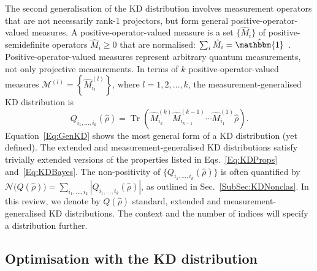\documentclass[%
 reprint,
superscriptaddress,
nofootinbib,
bibnotes,
 amsmath,amssymb,
 aps,
]{revtex4-1}
\theoremstyle{plain}
\DeclareMathOperator{\Tr}{Tr}
\newcommand{\LParen}{ \bm{(} }
\newcommand{\RParen}{ \bm{)} }
\begin{document}
The second generalisation of the KD distribution involves 
measurement operators that are not necessarily rank-1 projectors, but form general positive-operator-valued measures.  A positive-operator-valued measure is a set $\{ \hat{M}_i \}$ of 
positive-semidefinite operators $\hat{M}_i \geq 0$ that are normalised: $\sum_i \hat{M}_i = \hat{\mathbbm{1}}$~\cite{Nielsen11}.
Positive-operator-valued measures represent arbitrary quantum measurements, not only projective measurements.
In terms of $k$ positive-operator-valued measures $\mathcal{M}^{(l)} = \left\{  \hat{M}^{(l)}_{i_l} \right\}$, where $l = 1, 2, \ldots, k$, the measurement-generalised KD distribution is
\begin{equation}
\label{Eq:GenKD}
Q_{i_1,\ldots,i_k} (\hat{\rho}) = \Tr \left( \hat{M}^{(k)}_{i_k} \hat{M}^{(k-1)}_{i_{k-1}} \cdots \hat{M}^{(1)}_{i_1} \hat{\rho}    \right) .
\end{equation}
Equation~\eqref{Eq:GenKD} shows the 
most general form of a KD distribution (yet defined). 
The extended and measurement-generalised KD distributions satisfy trivially extended versions of the properties listed in Eqs.~\eqref{Eq:KDProps} and~\eqref{Eq:KDBayes}. The non-positivity of $\{ Q_{i_1,\ldots,i_k} (\hat{\rho}) \} $ is often quantified by $\mathcal{N} \LParen Q (\hat{\rho})  \RParen = \sum_{i_1,\ldots,i_k}  \left| Q_{i_1,\ldots,i_k} (\hat{\rho}) \right|$, as outlined in Sec.~\ref{SubSec:KDNonclas}.  In this review, we denote by $Q(\hat{\rho})$ standard, extended and measurement-generalised KD distributions. The context and the number of indices will specify a distribution further.


\subsection{Optimisation with the KD distribution}
\label{SubSec:Useage}
\end{document}
